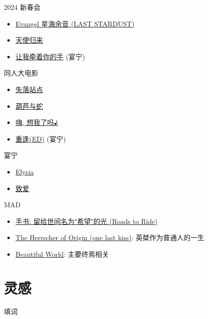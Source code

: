 \documentclass[a4paper]{article}
\begin{document}
2024 新春会

\begin{itemize}
    \item \href{https://www.bilibili.com/video/BV13c411v7DR/}{Evangel 星海余音 (LAST STARDUST)}
    \item \href{https://www.bilibili.com/video/BV1pp4y1m7Uh/}{天使归来}
    \item \href{https://www.bilibili.com/video/BV1te411h7aj/}{让我牵着你的手} (宴宁)
\end{itemize}

同人大电影

\begin{itemize}
    \item \href{https://www.bilibili.com/video/BV1Ud4y1z7mY/?t=309}{失落站点}
    \item \href{https://www.bilibili.com/video/BV1w24y1R7s9/}{葫芦与蛇}
    \item \href{https://www.bilibili.com/video/BV1LD4y117nq/}{嗨, 想我了吗♪}
    \item \href{https://www.bilibili.com/video/BV17D4y117DV/}{重逢(ED)} (宴宁)
\end{itemize}

宴宁

\begin{itemize}
    \item \href{https://www.bilibili.com/video/BV1dq4y1N7ry/}{Elysia}
    \item \href{https://www.bilibili.com/video/BV1bB4y1L7qh/}{致爱}
\end{itemize}

MAD

\begin{itemize}
    \item \href{https://www.bilibili.com/video/BV1cG41157Jx/}{手书: 留给世间名为"希望"的光 (Roads to Ride)}
    \item \href{https://www.bilibili.com/video/BV1nV4y1g7ti/}{The Herrscher of Origin (one last kiss)}: 英桀作为普通人的一生
    \item \href{https://www.bilibili.com/video/BV1XX4y1o7yN/}{Beautiful World}: 主要终焉相关
\end{itemize}

\section{灵感}

填词
\end{document}
